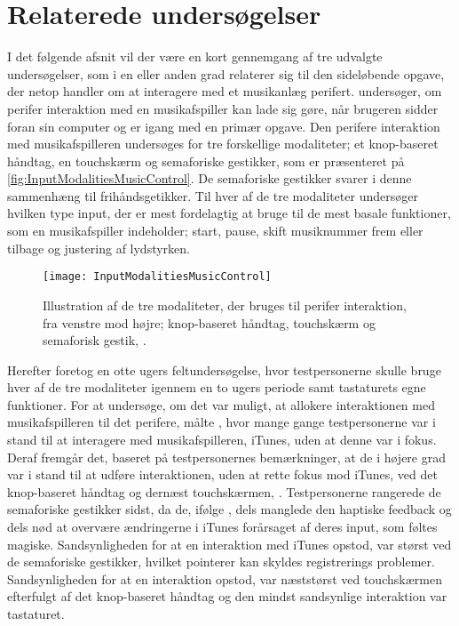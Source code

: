 \section{Relaterede undersøgelser}
\label{RelateretUndersoegelser}
%
I det følgende afsnit vil der være en kort gennemgang af tre udvalgte undersøgelser, som i en eller anden grad relaterer sig til den sideløbende opgave, der netop handler om at interagere med et musikanlæg perifert. \blankline
%
\textcite{PDF:ComparingInputModalities} undersøger, om perifer interaktion med en musikafspiller kan lade sig gøre, når brugeren sidder foran sin computer og er igang med en primær opgave. Den perifere interaktion med musikafspilleren undersøges for tre forskellige modaliteter; et knop-baseret håndtag, en touchskærm og semaforiske gestikker, som er præsenteret på \autoref{fig:InputModalitiesMusicControl}. De semaforiske gestikker svarer i denne sammenhæng til frihåndsgetikker. Til hver af de tre modaliteter undersøger \textcite[ss. 165-166]{PDF:ComparingInputModalities} hvilken type input, der er mest fordelagtig at bruge til de mest basale funktioner, som en musikafspiller indeholder; start, pause, skift musiknummer frem eller tilbage og justering af lydstyrken.  
%
\begin{figure}[H]
	\centering
	\texttt{[image: InputModalitiesMusicControl]}
	\caption{Illustration af de tre modaliteter, der bruges til perifer interaktion, fra venstre mod højre; knop-baseret håndtag, touchskærm og semaforisk gestik, \parencite[s. 163]{PDF:ComparingInputModalities}.}
	\label{fig:InputModalitiesMusicControl}
\end{figure}
\noindent
%
Herefter foretog \textcite[ss. 169-174]{PDF:ComparingInputModalities} en otte ugers feltundersøgelse, hvor testpersonerne skulle bruge hver af de tre modaliteter igennem en to ugers periode samt tastaturets egne funktioner. For at undersøge, om det var muligt, at allokere interaktionen med musikafspilleren til det perifere, målte \textcite[ss. 172-173]{PDF:ComparingInputModalities}, hvor mange gange testpersonerne var i stand til at interagere med musikafspilleren, iTunes, uden at denne var i fokus. Deraf fremgår det, baseret på testpersonernes bemærkninger, at de i højere grad var i stand til at udføre interaktionen, uden at rette fokus mod iTunes, ved det knop-baseret håndtag og dernæst touchskærmen, \parencite[ss. 172]{PDF:ComparingInputModalities}. Testpersonerne rangerede de semaforiske gestikker sidst, da de, ifølge \textcite[ss. 172-173]{PDF:ComparingInputModalities}, dels manglede den haptiske feedback og dels nød at overvære ændringerne i iTunes forårsaget af deres input, som føltes magiske. Sandsynligheden for at en interaktion med iTunes opstod, var størst ved de semaforiske gestikker, hvilket \textcite[s. 171]{PDF:ComparingInputModalities} pointerer kan skyldes registrerings problemer. Sandsynligheden for at en interaktion opstod, var næststørst ved touchskærmen efterfulgt af det knop-baseret håndtag og den mindst sandsynlige interaktion var tastaturet. 

